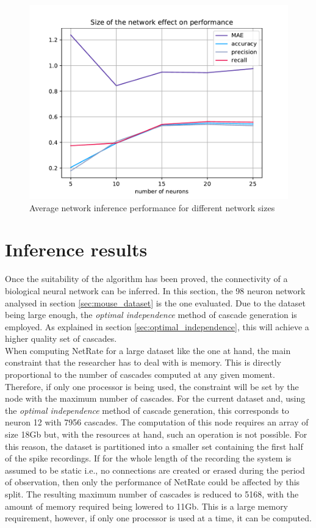 \begin{figure}
	\centering
	\includegraphics[width=0.8\linewidth]{size_effect_performance.pdf}
	\caption{Average network inference performance for different network sizes}
	\label{fig:results_network_sizes}
\end{figure}

\section{Inference results}

Once the suitability of the algorithm has been proved, the connectivity of a biological neural network can be inferred. In this section, the 98 neuron network analysed in section \ref{sec:mouse_dataset} is the one evaluated. Due to the dataset being large enough, the \textit{optimal independence} method of cascade generation is employed. As explained in section \ref{sec:optimal_independence}, this will achieve a higher quality set of cascades.\\

When computing NetRate for a large dataset like the one at hand, the main constraint that the researcher has to deal with is memory. This is directly proportional to the number of cascades computed at any given moment. Therefore, if only one processor is being used, the constraint will be set by the node with the maximum number of cascades. For the current dataset and, using the \textit{optimal independence} method of cascade generation, this corresponds to neuron 12 with 7956 cascades. The computation of this node requires an array of size 18Gb but, with the resources at hand, such an operation is not possible. For this reason, the dataset is partitioned into a smaller set containing the first half of the spike recordings. If for the whole length of the recording the system is assumed to be static i.e., no connections are created or erased during the period of observation, then only the performance of NetRate could be affected by this split. The resulting maximum number of cascades is reduced to 5168, with the amount of memory required being lowered to 11Gb. This is a large memory requirement, however, if only one processor is used at a time, it can be computed.\\

